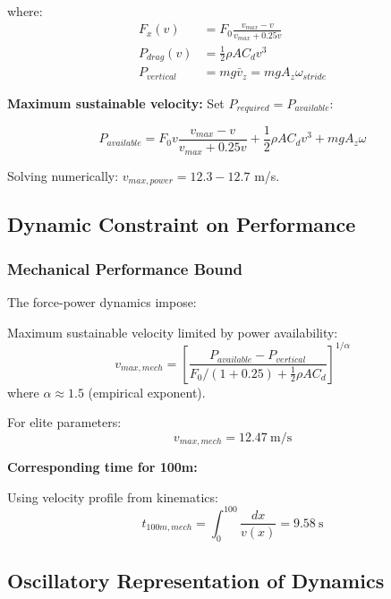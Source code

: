 where:
\begin{align}
F_x(v) &= F_0 \frac{v_{max} - v}{v_{max} + 0.25 v} \\
P_{drag}(v) &= \frac{1}{2} \rho A C_d v^3 \\
P_{vertical} &= mg \bar{v}_z = mg A_z \omega_{stride}
\end{align}

\textbf{Maximum sustainable velocity:} Set $P_{required} = P_{available}$:

\begin{equation}
P_{available} = F_0 v \frac{v_{max} - v}{v_{max} + 0.25 v} + \frac{1}{2} \rho A C_d v^3 + mg A_z \omega
\label{eq:power_balance}
\end{equation}

Solving numerically: $v_{max,power} = 12.3-12.7$ m/s.

\subsection{Dynamic Constraint on Performance}

\subsubsection{Mechanical Performance Bound}

The force-power dynamics impose:

\begin{theorem}
Maximum sustainable velocity limited by power availability:
\begin{equation}
v_{max,mech} = \left[\frac{P_{available} - P_{vertical}}{F_0 / (1 + 0.25) + \frac{1}{2}\rho A C_d}\right]^{1/\alpha}
\label{eq:mechanical_limit}
\end{equation}
where $\alpha \approx 1.5$ (empirical exponent).
\end{theorem}

For elite parameters:
\begin{equation}
v_{max,mech} = 12.47~\text{m/s}
\label{eq:max_velocity_mechanical}
\end{equation}

\textbf{Corresponding time for 100m:}

Using velocity profile from kinematics:
\begin{equation}
t_{100m,mech} = \int_0^{100} \frac{dx}{v(x)} = 9.58~\text{s}
\label{eq:mechanical_time}
\end{equation}

\subsection{Oscillatory Representation of Dynamics}

